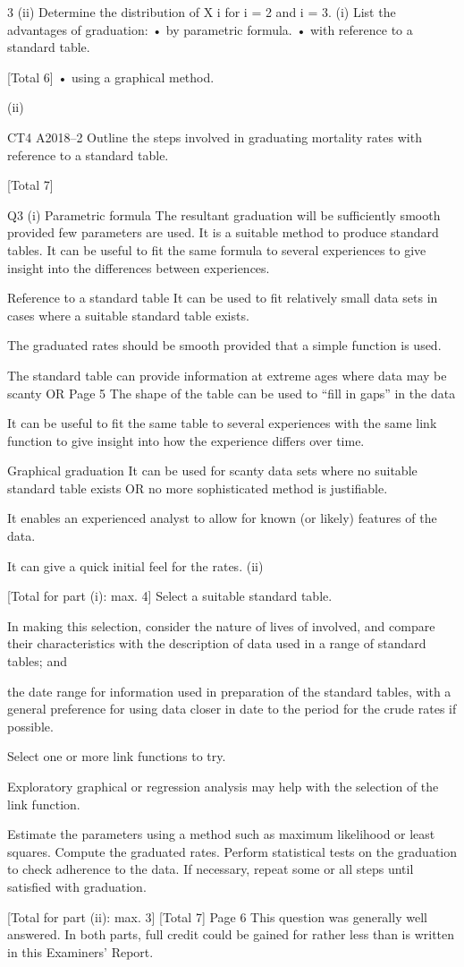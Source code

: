 \documentclass[a4paper,12pt]{article}
\begin{document}
3
(ii)
 Determine the distribution of X i for i = 2 and i = 3.
(i) List the advantages of graduation:
• by parametric formula.
• with reference to a standard table.

[Total 6]
• using a graphical method.

(ii)

CT4 A2018–2
Outline the steps involved in graduating mortality rates with reference to a
standard table.

[Total 7]

Q3
(i)
Parametric formula
The resultant graduation will be sufficiently smooth
provided few parameters are used. 
It is a suitable method to produce standard tables. 
It can be useful to fit the same formula to several experiences to give insight
into the differences between experiences.

Reference to a standard table
It can be used to fit relatively small data sets in cases where a suitable standard
table exists.

The graduated rates should be smooth provided that a simple function is used.

The standard table can provide information at extreme ages where data may be
scanty
OR
Page 5
The shape of the table can be used to “fill in gaps” in the data

It can be useful to fit the same table to several experiences with the same link
function to give insight into how the experience differs over time.

Graphical graduation
It can be used for scanty data sets where no suitable standard table exists
OR
no more sophisticated method is justifiable.

It enables an experienced analyst to allow for known (or likely) features of the
data.

It can give a quick initial feel for the rates.
(ii)

[Total for part (i): max. 4]
Select a suitable standard table.

In making this selection, consider the nature of lives of involved, and compare
their characteristics with the description of data used in a range of standard
tables; and

the date range for information used in preparation of the standard tables, with
a general preference for using data closer in date to the period for the crude
rates if possible.

Select one or more link functions to try.

Exploratory graphical or regression analysis may help with the selection of the
link function.

Estimate the parameters 
using a method such as maximum likelihood or least squares. 
Compute the graduated rates. 
Perform statistical tests on the graduation to check adherence to the data. 
If necessary, repeat some or all steps until satisfied with graduation.

[Total for part (ii): max. 3]
[Total 7]
Page 6
This question was generally well answered. In both parts, full
credit could be gained for rather less than is written in this
Examiners’ Report.
\end{document}
